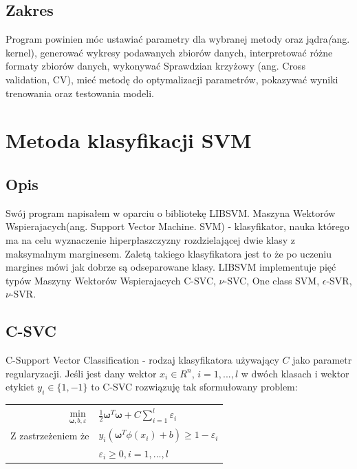 \documentclass[paper=a4, fontsize=11pt]{scrartcl} %
\numberwithin{equation}{section} %
\numberwithin{figure}{section} %
\begin{document}
\subsection{Zakres}
    Program powinien móc ustawiać parametry dla wybranej metody oraz jądra\textit(ang. kernel), 
    generować wykresy podawanych zbiorów danych, interpretować różne formaty zbiorów danych, 
    wykonywać Sprawdzian krzyżowy (ang. Cross validation, CV), mieć metodę do optymalizacji 
    parametrów, pokazywać wyniki trenowania oraz testowania modeli.
\newpage

\section{Metoda klasyfikacji SVM} %
\subsection{Opis}
    \par Swój program napisałem w oparciu o bibliotekę LIBSVM\cite{CC01a}. Maszyna Wektorów
    Wspierajacych(ang. Support Vector Machine. SVM) - klasyfikator, nauka którego ma na celu 
    wyznaczenie hiperpłaszczyzny rozdzielającej dwie klasy z maksymalnym marginesem. 
    Zaletą takiego klasyfikatora jest to że po uczeniu margines mówi jak dobrze są 
    odseparowane klasy. LIBSVM implementuje pięć typów Maszyny Wektorów Wspierajacych C-SVC, 
    $\nu$-SVC, One class SVM, $\epsilon$-SVR, $\nu$-SVR.
\subsection{C-SVC}
    \par C-Support Vector Classification - rodzaj klasyfikatora używający $C$ jako 
    parametr regularyzacji. Jeśli jest dany wektor $x_i \in R^n$, $i=1,...,l$ 
    w dwóch klasach i wektor etykiet $y_i \in \{1, -1\}$ to C-SVC rozwiązuję tak
    sformułowany problem:

    \begin{center}
        \begin{tabular}{rl}
            $\min\limits_{\pmb{\omega}, b, \varepsilon}$ & $\frac{1}{2} \pmb{\omega} ^T \pmb{\omega} +
            C \sum\limits_{i=1}^{l}\varepsilon_i$ \\
            Z zastrzeżeniem że & $y_i(\pmb{\omega}^T\phi(x_i) + b) \geq 1 - \varepsilon_i$ \\
                               & $\varepsilon_i \geq 0,i=1,...,l$
        \end{tabular}
    \end{center}
\end{document}
